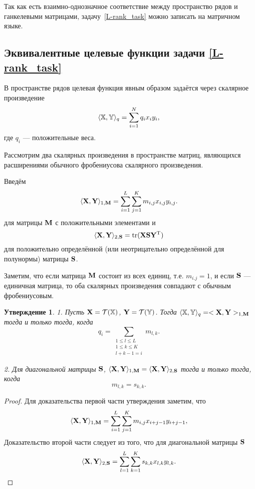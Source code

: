 \documentclass[12pt,a4paper,fleqn,leqno]{article}
\DeclareMathOperator{\tr}{tr}
\newtheorem{proposition}{Утверждение}%
\begin{document}
Так как есть взаимно-однозначное соответствие между пространство рядов и ганкелевыми матрицами,
задачу~\eqref{L-rank_task} можно записать на матричном языке.

\subsection{Эквивалентные целевые функции задачи \eqref{L-rank_task}}
В пространстве рядов целевая функция явным образом задаётся через скалярное произведение
\begin{equation}
\label{eq:norm_ser}
    \langle\mathbb{X},\mathbb{Y}\rangle_q = \sum_{i = 1}^N q_i x_i y_i,
\end{equation}
где $q_i$ --- положительные веса.

Рассмотрим два скалярных произведения в пространстве матриц, являющихся расширениями
обычного фробениусова скалярного произведения.

Введём
\begin{equation}
\label{eq:norm1M}
    \langle\mathbf{X},\mathbf{Y}\rangle_{1,\mathbf{M}} = \sum_{i = 1}^L \sum_{j=1}^K m_{i,j} x_{i,j} y_{i,j}.
\end{equation}
для матрицы $\mathbf{M}$ с положительными элементами и
\begin{equation}
\label{eq:norm2S}
    \langle\bfX,\bfY\rangle_{2,\bfS} = \tr(\bfX \bfS \bfY^\rmT)
\end{equation}
для положительно определённой (или неотрицательно определённой для полунормы) матрицы $\mathbf{S}$.

Заметим, что если матрица $\mathbf{M}$ состоит из всех единиц, т.е. $m_{i.j}=1$,
и если $\mathbf{S}$ --- единичная матрица, то оба скалярных произведения совпадают
с обычным фробениусовым.

\begin{proposition}
1. Пусть $\mathbf{X} = \mathcal{T}(\mathbb{X})$,  $\mathbf{Y} = \mathcal{T}(\mathbb{Y})$. Тогда $\langle\mathbb{X},\mathbb{Y}\rangle_q= <\mathbf{X},\mathbf{Y}>_{1,\mathbf{M}}$ тогда и только тогда, когда
\begin{equation}\label{qi_mi}
q_i = \sum_{\substack{1 \le l \le L \\ 1 \le k \le K \\ l+k-1=i}} m_{l,k}.
\end{equation}

2. Для диагональной матрицы $\mathbf{S}$, $\langle\mathbf{X},\mathbf{Y}\rangle_{1,\mathbf{M}}= \langle\mathbf{X},\mathbf{Y}\rangle_{2,\mathbf{S}}$ тогда и только тогда, когда
\begin{equation}\label{sk_mlk}
m_{l,k}=s_{k,k}.
\end{equation}
\end{proposition}
\begin{proof}
Для доказательства первой части утверждения заметим, что
\begin{equation*}
\langle \mathbf{X}, \mathbf{Y} \rangle_{1,\mathbf{M}} = \sum_{i = 1}^L \sum_{j = 1}^K m_{i,j} x_{i + j - 1} y_{i + j - 1},
\end{equation*}
Доказательство второй части следует из того, что для диагональной матрицы $\mathbf{S}$
\begin{equation*}
\langle \mathbf{X}, \mathbf{Y} \rangle_{2,\mathbf{S}} = \sum_{l=1}^L \sum_{k=1}^K s_{k,k} x_{l,k} y_{l, k}.
\end{equation*}
\end{proof}
\end{document}

